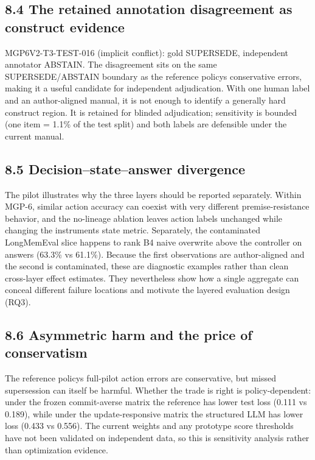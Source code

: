 \subsection{8.4 The retained annotation disagreement as construct
evidence}\label{the-retained-annotation-disagreement-as-construct-evidence}

MGP6V2-T3-TEST-016 (implicit conflict): gold SUPERSEDE, independent
annotator ABSTAIN. The disagreement sits on the same SUPERSEDE/ABSTAIN
boundary as the reference policy\textquotesingle s conservative errors,
making it a useful candidate for independent adjudication. With one
human label and an author-aligned manual, it is not enough to identify a
generally hard construct region. It is retained for blinded
adjudication; sensitivity is bounded (one item = 1.1\% of the test
split) and both labels are defensible under the current manual.

\subsection{8.5 Decision--state--answer
divergence}\label{decisionstateanswer-divergence}

The pilot illustrates why the three layers should be reported
separately. Within MGP-6, similar action accuracy can coexist with very
different premise-resistance behavior, and the no-lineage ablation
leaves action labels unchanged while changing the
instrument\textquotesingle s state metric. Separately, the contaminated
LongMemEval slice happens to rank B4 naive overwrite above the
controller on answers (63.3\% vs 61.1\%). Because the first observations
are author-aligned and the second is contaminated, these are diagnostic
examples rather than clean cross-layer effect estimates. They
nevertheless show how a single aggregate can conceal different failure
locations and motivate the layered evaluation design (RQ3).

\subsection{8.6 Asymmetric harm and the price of
conservatism}\label{asymmetric-harm-and-the-price-of-conservatism}

The reference policy\textquotesingle s full-pilot action errors are
conservative, but missed supersession can itself be harmful. Whether the
trade is right is policy-dependent: under the frozen commit-averse
matrix the reference has lower test loss (0.111 vs 0.189), while under
the update-responsive matrix the structured LLM has lower loss (0.433 vs
0.556). The current weights and any prototype score thresholds have not
been validated on independent data, so this is sensitivity analysis
rather than optimization evidence.

